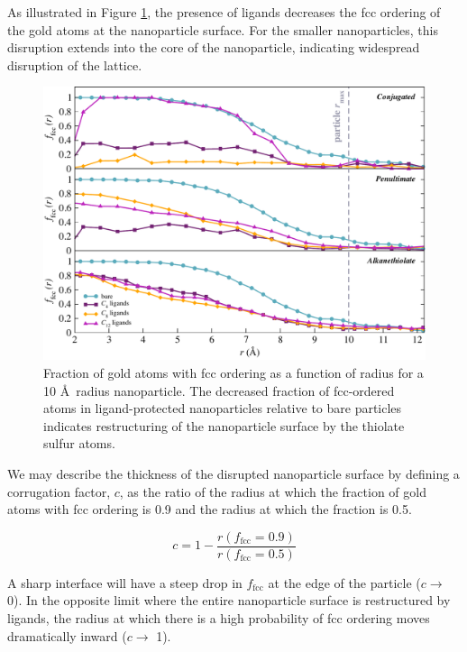 \documentclass[aps,jcp,preprint,showpacs,superscriptaddress,groupedaddress]{revtex4-1}  %
\begin{document}
As illustrated in Figure \ref{fig:Corrugation}, the presence of
ligands decreases the fcc ordering of the gold atoms at the
nanoparticle surface. For the smaller nanoparticles, this disruption
extends into the core of the nanoparticle, indicating widespread
disruption of the lattice.

\begin{figure}
  \includegraphics[width=\linewidth]{figures/fcc}
  \caption{Fraction of gold atoms with fcc ordering as a function of
    radius for a 10 \AA\ radius nanoparticle. The decreased fraction
    of fcc-ordered atoms in ligand-protected nanoparticles relative to
    bare particles indicates restructuring of the nanoparticle surface
    by the thiolate sulfur atoms.}
  \label{fig:Corrugation}
\end{figure}

We may describe the thickness of the disrupted nanoparticle surface by
defining a corrugation factor, $c$, as the ratio of the radius at
which the fraction of gold atoms with fcc ordering is 0.9 and the
radius at which the fraction is 0.5.

\begin{equation}
	c = 1 - \frac{r(f_\mathrm{fcc} = 0.9)}{r(f_\mathrm{fcc} = 0.5)}
\end{equation}

A sharp interface will have a steep drop in $f_\mathrm{fcc}$ at the
edge of the particle ($c \rightarrow$ 0). In the opposite limit where
the entire nanoparticle surface is restructured by ligands, the radius
at which there is a high probability of fcc ordering moves
dramatically inward ($c \rightarrow$ 1).
\end{document}
